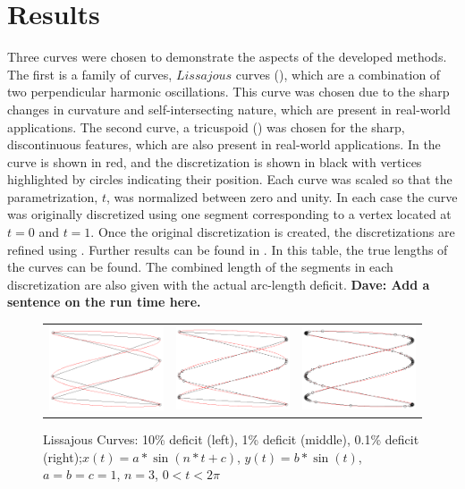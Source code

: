 \section{Results}
Three curves were chosen to demonstrate the aspects of the developed 
methods. The first is a family of curves, $Lissajous$ curves 
(), which are a combination of two perpendicular 
harmonic oscillations. This curve was chosen due to the sharp changes in 
curvature and self-intersecting nature, which are present in real-world 
applications. The second curve, a tricuspoid 
() was chosen for the sharp, discontinuous features, 
which are also present in real-world applications. 
In  the curve is shown in red, and the discretization is shown in black with vertices highlighted by circles indicating their position. Each curve was scaled so that the parametrization, $t$, was normalized between zero and unity. In each case the curve was originally discretized using one segment corresponding to a vertex located at $t=0$ and $t=1$. Once the original discretization is created, the discretizations are refined using . Further results can be found in . In this table, the true lengths of the curves can be found. The combined length of the segments in each discretization are also given with the actual arc-length deficit.
{\bf{Dave:  Add a sentence on the run time here.}}

\begin{figure}[h!]
  \centering
  \begin{tabular}{ccc}
  \includegraphics[width=0.3\linewidth]{Figures/lissajous01.png} &
  \includegraphics[width=0.3\linewidth]{Figures/lissajous001.png} &
  \includegraphics[width=0.3\linewidth]{Figures/lissajous0001.png}
  \end{tabular}
  \caption{\label{fig:lissajous} Lissajous Curves: 10\% deficit (left), 
1\% deficit (middle), 0.1\% deficit (right);\newline $x(t) = a * \sin(n*t 
+ c)$, $y(t) = b* \sin(t)$, $a=b=c=1$, $n=3$, $0 < t < 2\pi$}
\end{figure}

